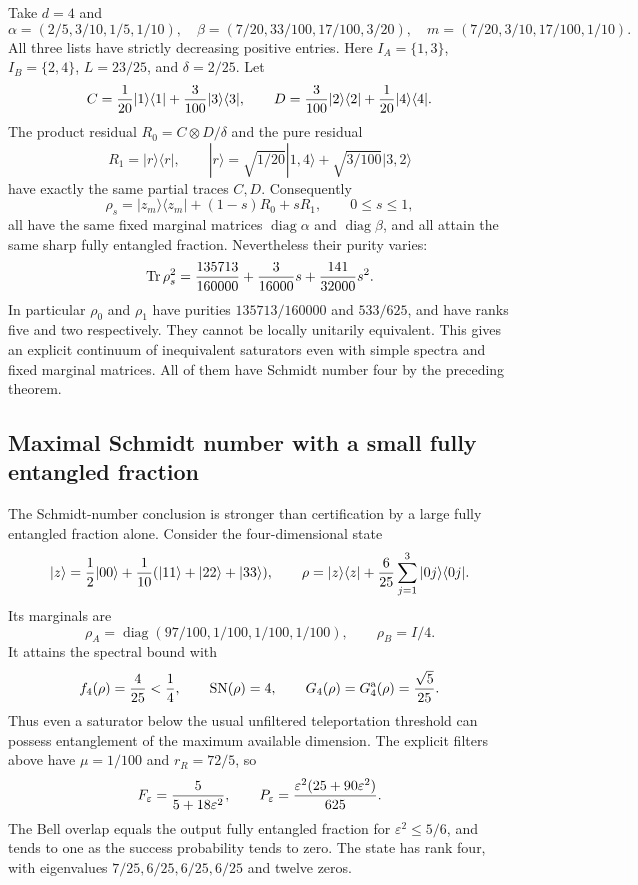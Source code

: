 Take $d=4$ and
\[
 \alpha=(2/5,3/10,1/5,1/10),\quad
 \beta=(7/20,33/100,17/100,3/20),\quad
 m=(7/20,3/10,17/100,1/10).
\]
All three lists have strictly decreasing positive entries. Here
$I_A=\{1,3\}$, $I_B=\{2,4\}$, $L=23/25$, and $\delta=2/25$.
Let
\[
 C={1\over20}|1\rangle\langle1|+{3\over100}|3\rangle\langle3|,
 \qquad
 D={3\over100}|2\rangle\langle2|+{1\over20}|4\rangle\langle4|.
\]
The product residual $R_0=C\otimes D/\delta$ and the pure residual
\[
 R_1=|r\rangle\langle r|,\qquad
 |r\rangle=\sqrt{1/20}|1,4\rangle+\sqrt{3/100}|3,2\rangle
\]
have exactly the same partial traces $C,D$. Consequently
\[
 \rho_s=|z_m\rangle\langle z_m|+(1-s)R_0+sR_1,\qquad0\le s\le1,
\]
all have the same fixed marginal matrices $\operatorname{diag}\alpha$ and
$\operatorname{diag}\beta$, and all attain the same sharp fully entangled
fraction. Nevertheless their purity varies:
\[
 \operatorname{Tr}\rho_s^2
 = {135713\over160000}+{3\over16000}s+{141\over32000}s^2.
\]
In particular $\rho_0$ and $\rho_1$ have purities $135713/160000$ and
$533/625$, and have ranks five and two respectively. They cannot be locally
unitarily equivalent. This gives an explicit continuum of inequivalent
saturators even with simple spectra and fixed marginal matrices. All of
them have Schmidt number four by the preceding theorem.

\subsection{Maximal Schmidt number with a small fully entangled fraction}

The Schmidt-number conclusion is stronger than certification by a large
fully entangled fraction alone. Consider the four-dimensional state
\[
 |z\rangle={1\over2}|00\rangle+
       {1\over10}(|11\rangle+|22\rangle+|33\rangle),\qquad
 \rho=|z\rangle\langle z|+{6\over25}\sum_{j=1}^3|0j\rangle\langle0j|.
\]
Its marginals are
\[
 \rho_A=\operatorname{diag}(97/100,1/100,1/100,1/100),\qquad
 \rho_B=I/4.
\]
It attains the spectral bound with
\[
 f_4(\rho)={4\over25}<{1\over4},\qquad
 \operatorname{SN}(\rho)=4,\qquad
 G_4(\rho)=G_4^{\mathrm a}(\rho)={\sqrt5\over25}.
\]
Thus even a saturator below the usual unfiltered teleportation threshold
can possess entanglement of the maximum available dimension. The explicit
filters above have $\mu=1/100$ and $r_R=72/5$, so
\[
 F_\varepsilon={5\over5+18\varepsilon^2},\qquad
 P_\varepsilon={\varepsilon^2(25+90\varepsilon^2)\over625}.
\]
The Bell overlap equals the output fully entangled fraction for
$\varepsilon^2\le5/6$, and tends to one as the success probability tends
to zero. The state has rank four, with eigenvalues
$7/25,6/25,6/25,6/25$ and twelve zeros.

